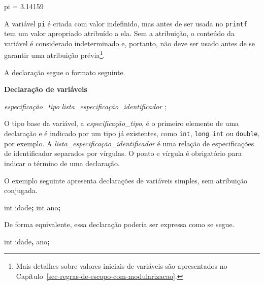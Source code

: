 \documentclass[
  11pt,
  a4paper,
]{scrbook}
\newenvironment{Shaded}{\begin{snugshade}}{\end{snugshade}}
\newcommand{\DataTypeTok}[1]{\textcolor[rgb]{0.13,0.29,0.53}{#1}}
\newcommand{\NormalTok}[1]{#1}
\newcommand{\OperatorTok}[1]{\textcolor[rgb]{0.81,0.36,0.00}{\textbf{#1}}}
\begin{document}
\begin{Shaded}
\begin{Highlighting}[]
\NormalTok{pi = 3.14159}
\end{Highlighting}
\end{Shaded}

A variável \texttt{pi} é criada com valor indefinido, mas antes de ser
usada no \texttt{printf} tem um valor apropriado atribuído a ela. Sem a
atribuição, o conteúdo da variável é considerado indeterminado e,
portanto, não deve ser usado antes de se garantir uma atribuição
prévia\footnote{Mais detalhes sobre valores iniciais de variáveis são
  apresentados no Capítulo~\ref{sec-regras-de-escopo-com-modularizacao}.}.

 A declaração segue o formato seguinte.

\begin{tcolorbox}[enhanced jigsaw, colback=white, arc=.35mm, colframe=quarto-callout-color-frame, toprule=.15mm, leftrule=.75mm, left=2mm, rightrule=.15mm, bottomrule=.15mm, opacityback=0, breakable]

\vspace{-3mm}\textbf{Declaração de variáveis}\vspace{3mm}

\emph{especificação\_tipo} \emph{lista\_especificação\_identificador} ;

\end{tcolorbox}

O tipo base da variável, a \emph{especificação\_tipo}, é o primeiro
elemento de uma declaração e é indicado por um tipo já existentes, como
\texttt{int}, \texttt{long\ int} ou \texttt{double}, por exemplo. A
\emph{lista\_especificação\_identificador} é uma relação de
especificações de identificador separados por vírgulas. O ponto e
vírgula é obrigatório para indicar o término de uma declaração.

O exemplo seguinte apresenta declarações de variáveis simples, sem
atribuição conjugada.

\begin{Shaded}
\begin{Highlighting}[]
\DataTypeTok{int}\NormalTok{ idade}\OperatorTok{;}
\DataTypeTok{int}\NormalTok{ ano}\OperatorTok{;}
\end{Highlighting}
\end{Shaded}

De forma equivalente, essa declaração poderia ser expressa como se
segue.

\begin{Shaded}
\begin{Highlighting}[]
\DataTypeTok{int}\NormalTok{ idade}\OperatorTok{,}\NormalTok{ ano}\OperatorTok{;}
\end{Highlighting}
\end{Shaded}
\end{document}
